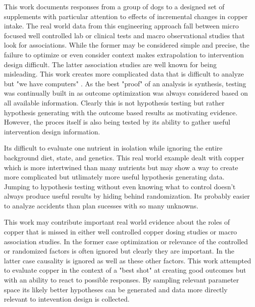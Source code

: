 

This work documents responses from  a group of dogs to a designed
set of supplements with particular attention to effects of incremental
changes in copper intake.  The real world data from this engineering
approach fall between micro focused well controlled lab or clinical
tests and macro observational studies that look for associations.
While the former may be considered simple and precise, the failure to optimize or
even consider context makes extrapolation to intervention design difficult.
The latter association studies are well known for being misleading.
This work creates more complicated data that is difficult to analyze
but "we have computers"  .  
As the best "proof" of an analysis is synthesis, testing was continually
built in as outcome optimization was always considered based on 
all available information. Clearly this is not hypothesis testing but
rather hypothesis generating with the outcome based results as 
motivating evidence. However, the proces itself is also being tested
by its ability to gather useful intervention design information.  


Its difficult to evaluate one nutrient in isolation while ignoring
the entire background diet, state, and genetics. This real world
example dealt with copper which is more intertwined than
many nutrients but may show a way to create more complicated but
utlimately more useful hypothesis generating data. Jumping to
hypothesis testing without even knowing what to control 
doesn't always produce useful results by hiding behind randomization.
Its probably easier to analyze accidents than plan sucesses
with so many unknowns. 




This work may contribute important real world evidence
about the roles of copper that is missed in either well controlled
copper dosing studies or macro association studies. In the former
case optimization or relevance of the controlled or randomized
factors is often ignored but clearly they are important. In the
latter case causality is ignored as well as these other factors.
This work attempted to evaluate copper in the context of a "best
shot" at creating good outcomes but with an ability to react to
possible responses. By sampling relevant parameter space its likely
better hypotheses can be generated and data more directly relevant
to intevention design is collected. 


